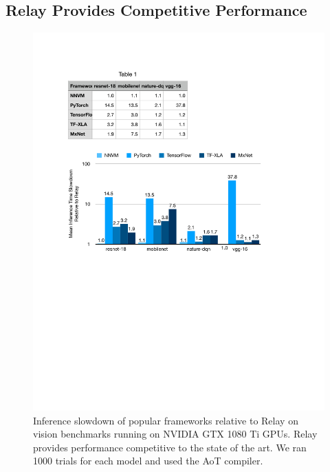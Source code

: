   \subsection{Relay Provides Competitive Performance}
  \label{sec:perf-gpu}

  \begin{figure}[h]
    \includegraphics[width=
    \textwidth]{fig_splash19/eval/vision_1080Ti_relay.pdf}
    \caption{
      Inference slowdown of popular frameworks relative to Relay on vision
        benchmarks running on NVIDIA GTX 1080 Ti GPUs.
      Relay provides performance competitive to the state of the art.
      We ran 1000 trials for each model and used the AoT compiler.
    }
    \label{fig:vision-eval}
  \end{figure}

